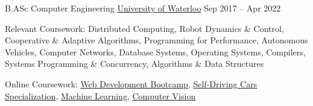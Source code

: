 \documentclass[]{awesome-cv}
\begin{document}
\begin{cventries}
	\cventry
	{B.ASc Computer Engineering}
	{\href{https://uwaterloo.ca/future-students/programs/computer-engineering}{University of Waterloo}}
	{}
	{Sep 2017 – Apr 2022}
	{\begin{cvitems}
	    \item Relevant Coursework: Distributed Computing, Robot Dynamics \& Control, Cooperative \& Adaptive Algorithms, Programming for Performance, Autonomous Vehicles, Computer Networks, Database Systems, Operating Systems, Compilers, Systems Programming \& Concurrency, Algorithms \& Data Structures
	    \item Online Coursework: \href{https://www.udemy.com/certificate/UC-28be8e98-f2a4-4989-b09c-df1ee4a4cc03/}{Web Development Bootcamp},
	    \href{https://www.coursera.org/account/accomplishments/specialization/BA8UYMH6SUSL}{Self-Driving Cars Specialization},
	    \href{https://www.coursera.org/account/accomplishments/verify/AELG6KXXJ88V}{Machine Learning}, \href{https://www.udemy.com/certificate/UC-TJRJ90AG/}{Computer Vision}
	\end{cvitems}}
\end{cventries}
\end{document}
